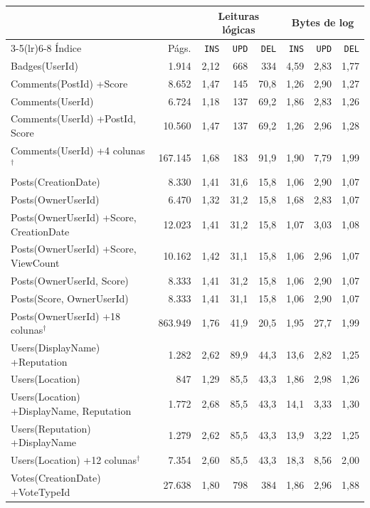 {\footnotesize\setlength{\tabcolsep}{2.5pt}
\begin{tabular}{lrrrrrrr}
\toprule
 &  & \multicolumn{3}{c}{Leituras lógicas} & \multicolumn{3}{c}{Bytes de log} \\
\cmidrule(lr){3-5}\cmidrule(lr){6-8}
Índice & Págs. & \texttt{INS} & \texttt{UPD} & \texttt{DEL} & \texttt{INS} & \texttt{UPD} & \texttt{DEL} \\
\midrule
Badges(UserId) & 1.914 & 2,12 & 668 & 334 & 4,59 & 2,83 & 1,77 \\
Comments(PostId) +Score & 8.652 & 1,47 & 145 & 70,8 & 1,26 & 2,90 & 1,27 \\
Comments(UserId) & 6.724 & 1,18 & 137 & 69,2 & 1,86 & 2,83 & 1,26 \\
Comments(UserId) +PostId, Score & 10.560 & 1,47 & 137 & 69,2 & 1,26 & 2,96 & 1,28 \\
Comments(UserId) +4 colunas$^{\dagger}$ & 167.145 & 1,68 & 183 & 91,9 & 1,90 & 7,79 & 1,99 \\
Posts(CreationDate) & 8.330 & 1,41 & 31,6 & 15,8 & 1,06 & 2,90 & 1,07 \\
Posts(OwnerUserId) & 6.470 & 1,32 & 31,2 & 15,8 & 1,68 & 2,83 & 1,07 \\
Posts(OwnerUserId) +Score, CreationDate & 12.023 & 1,41 & 31,2 & 15,8 & 1,07 & 3,03 & 1,08 \\
Posts(OwnerUserId) +Score, ViewCount & 10.162 & 1,42 & 31,1 & 15,8 & 1,06 & 2,96 & 1,07 \\
Posts(OwnerUserId, Score) & 8.333 & 1,41 & 31,2 & 15,8 & 1,06 & 2,90 & 1,07 \\
Posts(Score, OwnerUserId) & 8.333 & 1,41 & 31,1 & 15,8 & 1,06 & 2,90 & 1,07 \\
Posts(OwnerUserId) +18 colunas$^{\dagger}$ & 863.949 & 1,76 & 41,9 & 20,5 & 1,95 & 27,7 & 1,99 \\
Users(DisplayName) +Reputation & 1.282 & 2,62 & 89,9 & 44,3 & 13,6 & 2,82 & 1,25 \\
Users(Location) & 847 & 1,29 & 85,5 & 43,3 & 1,86 & 2,98 & 1,26 \\
Users(Location) +DisplayName, Reputation & 1.772 & 2,68 & 85,5 & 43,3 & 14,1 & 3,33 & 1,30 \\
Users(Reputation) +DisplayName & 1.279 & 2,62 & 85,5 & 43,3 & 13,9 & 3,22 & 1,25 \\
Users(Location) +12 colunas$^{\dagger}$ & 7.354 & 2,60 & 85,5 & 43,3 & 18,3 & 8,56 & 2,00 \\
Votes(CreationDate) +VoteTypeId & 27.638 & 1,80 & 798 & 384 & 1,86 & 2,96 & 1,88 \\

\end{tabular}}
